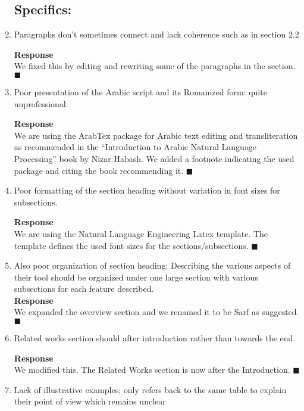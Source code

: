 \begin{enumerate}[leftmargin=0mm,label=\bfseries CommentR2.\arabic*]
\subsection*{Specifics:}
\item \label{Review.2.4}
Paragraphs don't sometimes connect and lack coherence such as in section 2.2

\textbf{Response}\\
We fixed this by editing and rewriting some of the paragraphs in the section.
$\blacksquare$

\item \label{Review.2.5}
Poor presentation of the Arabic script and its Romanized form: quite unprofessional.

\textbf{Response}\\
We are using the ArabTex package for Arabic text editing and transliteration as recommended in the ``Introduction to Arabic Natural Language Processing'' book by Nizar Habash.
We added a footnote indicating the used package and citing the book recommending it.
$\blacksquare$

\item \label{Review.2.6}
Poor formatting of the section heading without variation in font sizes for subsections.

\textbf{Response}\\
We are using the Natural Language Engineering Latex template. The template defines the used font sizes for the sections/subsections. 
$\blacksquare$

\item \label{Review.2.7}
Also poor organization of section heading: Describing the various
aspects of their tool should be organized under one large section with various
subsections for each feature described.\\
\textbf{Response}\\
We expanded the overview section and we renamed it to be Sarf as suggested. 
$\blacksquare$

\item \label{Review.2.8}
Related works section should after introduction rather than towards the end.

\textbf{Response}\\
We modified this. The Related Works section is now after the Introduction.
$\blacksquare$

\item \label{Review.2.9}
Lack of illustrative examples; only refers back to the same table to explain
their point of view which remains unclear


\end{enumerate}
